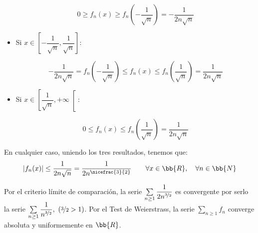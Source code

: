 \begin{ejercicio}
\begin{itemize}
        \begin{equation*}
            0\geq f_n(x) \geq f_n\left(-\frac{1}{\sqrt{n}}\right) = -\frac{1}{2n\sqrt{n}}
        \end{equation*}
        
        \item {Si $x\in \left[-\dfrac{1}{\sqrt{n}},\dfrac{1}{\sqrt{n}}\right]$}:
        
        \begin{equation*}
            -\frac{1}{2n\sqrt{n}} = f_n\left(-\frac{1}{\sqrt{n}}\right) \leq f_n(x) \leq f_n\left(\frac{1}{\sqrt{n}}\right) = \frac{1}{2n\sqrt{n}}
        \end{equation*}

        \item {Si $x\in \left[\dfrac{1}{\sqrt{n}},+\infty\right[$}:
        
        \begin{equation*}
            0\leq f_n(x) \leq f_n\left(\frac{1}{\sqrt{n}}\right) = \frac{1}{2n\sqrt{n}}
        \end{equation*}
    \end{itemize}

    En cualquier caso, uniendo los tres resultados, tenemos que:
    \begin{equation*}
        |{f_n(x)}| \leq \frac{1}{2n\sqrt{n}}=\frac{1}{2n^{\nicefrac{3}{2}}} \qquad \forall x\in\bb{R},\quad \forall n\in\bb{N}
    \end{equation*}

    Por el criterio límite de comparación, la serie $\sum\limits_{n\geq 1}\dfrac{1}{2n^{\nicefrac{3}{2}}}$ es convergente por serlo la
    serie $\sum\limits_{n\geq 1}\dfrac{1}{n^{\nicefrac{3}{2}}},~\left(\nicefrac{3}{2}>1\right)$.
    Por el Test de Weierstrass, la serie $\sum\limits_{n\geq 1}f_n$ converge absoluta y uniformemente en $\bb{R}$.
\end{ejercicio}



